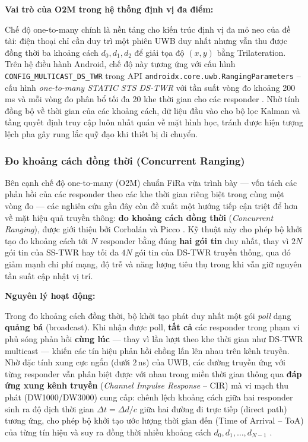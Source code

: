 \par\vspace{0.5em}
\textbf{Vai trò của O2M trong hệ thống định vị đa điểm:}
\par\vspace{0.3em}
Chế độ one-to-many chính là nền tảng cho kiến trúc định vị đa mỏ neo của đề tài: điện thoại chỉ cần duy trì một phiên UWB duy nhất nhưng vẫn thu được đồng thời ba khoảng cách $d_0, d_1, d_2$ để giải tọa độ $(x, y)$ bằng Trilateration. Trên hệ điều hành Android, chế độ này tương ứng với cấu hình \texttt{CONFIG\_MULTICAST\_DS\_TWR} trong API \texttt{androidx.core.uwb.RangingParameters} -- cấu hình \textit{one-to-many STATIC STS DS-TWR} với tần suất vòng đo khoảng 200\,ms và mỗi vòng đo phân bổ tối đa 20 khe thời gian cho các responder \cite{android_ranging}. Nhờ tính đồng bộ về thời gian của các khoảng cách, dữ liệu đầu vào cho bộ lọc Kalman và tầng quyết định truy cập luôn nhất quán về mặt hình học, tránh được hiện tượng lệch pha gây rung lắc quỹ đạo khi thiết bị di chuyển.

\subsubsection{Đo khoảng cách đồng thời (Concurrent Ranging)}

Bên cạnh chế độ one-to-many (O2M) chuẩn FiRa vừa trình bày --- vốn tách các phản hồi của các responder theo các khe thời gian riêng biệt trong cùng một vòng đo --- các nghiên cứu gần đây còn đề xuất một hướng tiếp cận triệt để hơn về mặt hiệu quả truyền thông: \textbf{đo khoảng cách đồng thời} (\textit{Concurrent Ranging}), được giới thiệu bởi Corbalán và Picco \cite{corbalan2020concurrent}. Kỹ thuật này cho phép bộ khởi tạo đo khoảng cách tới $N$ responder bằng đúng \textbf{hai gói tin} duy nhất, thay vì $2N$ gói tin của SS-TWR hay tối đa $4N$ gói tin của DS-TWR truyền thống, qua đó giảm mạnh chi phí mạng, độ trễ và năng lượng tiêu thụ trong khi vẫn giữ nguyên tần suất cập nhật vị trí.

\par\vspace{0.5em}
\textbf{Nguyên lý hoạt động:}
\par\vspace{0.3em}
Trong đo khoảng cách đồng thời, bộ khởi tạo phát duy nhất một gói \textit{poll} dạng \textbf{quảng bá} (broadcast). Khi nhận được poll, \textbf{tất cả} các responder trong phạm vi phủ sóng phản hồi \textbf{cùng lúc} --- thay vì lần lượt theo khe thời gian như DS-TWR multicast --- khiến các tín hiệu phản hồi chồng lấn lên nhau trên kênh truyền. Nhờ đặc tính xung cực ngắn (dưới $2$\,ns) của UWB, các đường truyền ứng với từng responder vẫn phân biệt được với nhau trong miền thời gian thông qua \textbf{đáp ứng xung kênh truyền} (\textit{Channel Impulse Response} -- CIR) mà vi mạch thu phát (DW1000/DW3000) cung cấp: chênh lệch khoảng cách giữa hai responder sinh ra độ dịch thời gian $\Delta t = \Delta d / c$ giữa hai đường đi trực tiếp (direct path) tương ứng, cho phép bộ khởi tạo ước lượng thời gian đến (Time of Arrival -- ToA) của từng tín hiệu và suy ra đồng thời nhiều khoảng cách $d_0, d_1, \dots, d_{N-1}$ \cite{corbalan2020concurrent}.

